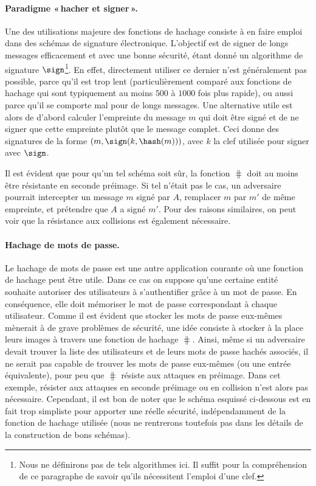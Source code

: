 \paragraph{Paradigme «\,hacher et signer\,».}
Une des utilisations majeure des fonctions de hachage consiste à en faire emploi dans des schémas de signature électronique.
L'objectif est de signer de longs messages efficacement et avec une bonne sécurité, étant donné un algorithme de signature
$\sign$\footnote{Nous ne définirons pas de tels algorithmes ici. Il suffit pour la compréhension de ce paragraphe
de savoir qu'ils nécessitent l'emploi d'une clef.}. En effet, directement utiliser ce dernier n'est généralement pas possible, parce qu'il est trop lent (particulièrement
comparé aux fonctions de hachage qui sont typiquement au moins $500$ à $1000$ fois plus rapide), ou aussi parce qu'il se comporte mal
pour de longs messages. Une alternative utile est alors de d'abord calculer l'empreinte du message $m$
qui doit être signé
et de ne signer que cette empreinte plutôt que le message complet.
Ceci donne des signatures de la forme $(m, \sign(k,\hash(m)))$, avec $k$ la clef utilisée pour signer avec $\sign$. 

Il est évident que pour qu'un tel schéma soit sûr, la fonction $\hash$ doit au moins être résistante en seconde préimage. Si tel n'était pas le cas, un adversaire
pourrait intercepter un message $m$ signé par $A$, remplacer $m$ par $m'$ de même empreinte, et prétendre que $A$ a signé $m'$.
Pour des raisons similaires, on peut voir que la résistance aux collisions est également nécessaire.

\paragraph{Hachage de mots de passe.} Le hachage de mots de passe est une autre application courante où une fonction
de hachage peut être utile. Dans ce cas
on suppose qu'une certaine entité souhaite autoriser des utilisateurs à s'authentifier grâce à un mot de passe.
En conséquence, elle doit mémoriser le mot de passe correspondant à chaque utilisateur. Comme il est évident que stocker les mots
de passe eux-mêmes mènerait à de grave problèmes de sécurité, une idée consiste à stocker à la place leurs images à travers une fonction
de hachage $\hash$. Ainsi, même si un adversaire devait trouver la liste des utilisateurs et de leurs mots de passe hachés associés, il ne serait
pas capable de trouver les mots de passe eux-mêmes (ou une entrée équivalente), pour peu que $\hash$ résiste aux attaques en préimage.
Dans cet exemple, résister aux attaques en seconde préimage ou en collision n'est alors pas nécessaire. Cependant, il est bon de noter
que le schéma esquissé ci-dessous est en fait trop simpliste pour apporter une réelle sécurité, indépendamment de la fonction de hachage
utilisée (nous ne rentrerons toutefois pas dans les détails de la construction de bons schémas).


